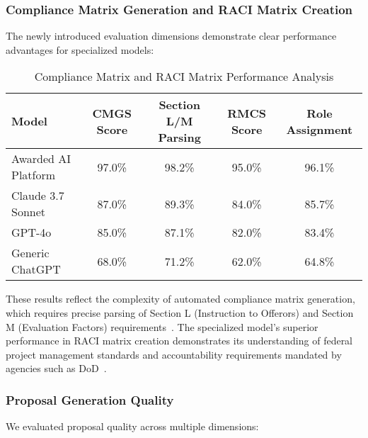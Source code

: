 \documentclass[11pt,a4paper]{article}
\begin{document}
\subsubsection{Compliance Matrix Generation and RACI Matrix Creation}

The newly introduced evaluation dimensions demonstrate clear performance advantages for specialized models:

\begin{table}[H]
\centering
\caption{Compliance Matrix and RACI Matrix Performance Analysis}
\label{tab:matrix_performance}
\begin{tabular}{@{}lcccc@{}}
\toprule
\textbf{Model} & \textbf{CMGS Score} & \textbf{Section L/M Parsing} & \textbf{RMCS Score} & \textbf{Role Assignment} \\
\midrule
Awarded AI Platform & 97.0\% & 98.2\% & 95.0\% & 96.1\% \\
Claude 3.7 Sonnet & 87.0\% & 89.3\% & 84.0\% & 85.7\% \\
GPT-4o & 85.0\% & 87.1\% & 82.0\% & 83.4\% \\
Generic ChatGPT & 68.0\% & 71.2\% & 62.0\% & 64.8\% \\
\bottomrule
\end{tabular}
\end{table}

These results reflect the complexity of automated compliance matrix generation, which requires precise parsing of Section L (Instruction to Offerors) and Section M (Evaluation Factors) requirements~\citep{far2025}. The specialized model's superior performance in RACI matrix creation demonstrates its understanding of federal project management standards and accountability requirements mandated by agencies such as DoD~\citep{dod2025guidelines}.

\subsubsection{Proposal Generation Quality}

We evaluated proposal quality across multiple dimensions:
\end{document}
